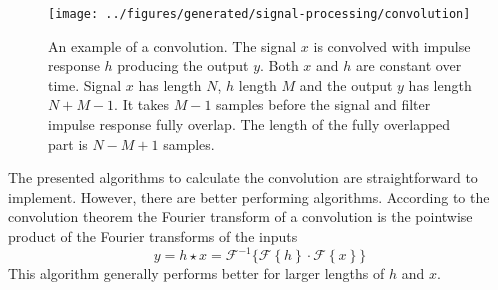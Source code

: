 \begin{figure}[H]
        \centering
        \texttt{[image: ../figures/generated/signal-processing/convolution]}
        \caption{An example of a convolution. The signal $x$ is convolved with impulse response $h$ producing the output $y$.
        Both $x$ and $h$ are constant over time. Signal $x$ has length $N$, $h$ length $M$ and the output $y$ has length $N+M-1$. It takes $M-1$ samples before the signal and filter impulse response fully overlap.
        The length of the fully overlapped part is $N-M+1$ samples.
        }
        \label{fig:theory_signal_processing_convolution}
\end{figure}

The presented algorithms to calculate the convolution are straightforward to implement.
However, there are better performing algorithms. According to the convolution theorem the Fourier transform of a convolution is the pointwise product of the Fourier transforms of the inputs
\begin{equation}\label{eq:theory_signal_processing_convolution_fourier}
 y = h \star x = \mathcal{F}^{-1} \Big\{ \mathcal{F}\left\{ h \right\} \cdot \mathcal{F}\left\{ x \right\} \Big\}
\end{equation}
This algorithm generally performs better for larger lengths of $h$ and $x$.

